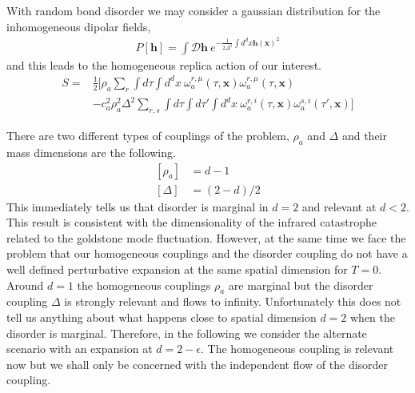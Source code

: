 \documentclass[notitlepage,onecolumn,showpacs,11pt]{revtex4-1}
\newcommand{\mbf}[1]{\mathbf{#1}}
\begin{document}
With random bond disorder we may consider a gaussian distribution for the inhomogeneous dipolar 
fields,
\begin{equation}
    \begin{aligned}
        P\left[\mbf{h}\right]=\int\mathcal{D}\mbf{h} \ 
        e^{-\frac{1}{2\Delta^2}\int d^dx\mbf{h}(\mbf{x})^2}
    \end{aligned}
\end{equation}
and this leads to the homogeneous replica action of our interest.
\begin{equation}
    \begin{aligned}
        S =& \frac{1}{2}\Big[
            \rho_a
            \sum_{r}\int d\tau\int d^dx\
            \omega^{r,\mu}_a(\tau,\mbf{x})\omega^{r,\mu}_a(\tau,\mbf{x})\\
            &-
            c^2_a\rho^2_a\Delta^2
            \sum_{r,s}
            \int d\tau\int d\tau'\int d^dx\
            \omega^{r,i}_a(\tau,\mbf{x})
            \omega^{s,i}_a(\tau',\mbf{x})
            \Big]
    \end{aligned}
\end{equation}

There are two different types of couplings of the problem, $\rho_a$ and $\Delta$ and their mass 
dimensions are the following.
\begin{equation}
    \begin{aligned}
        \left[\rho_a\right] &= d - 1\\
        \left[\Delta\right] &= (2-d)/2
    \end{aligned}
\end{equation}
This immediately tells us that disorder is marginal in $d=2$ and relevant at $d<2$. This
result is consistent with the dimensionality of the infrared catastrophe related to the
goldstone mode fluctuation. However, at the same time we face the problem that our
homogeneous couplings and the disorder coupling do not have a well defined perturbative 
expansion at the same spatial dimension for $T=0$. Around $d=1$ the homogeneous couplings
$\rho_a$ are marginal but the disorder coupling $\Delta$ is strongly relevant and flows to
infinity. Unfortunately this does not tell us anything about what happens close to spatial 
dimension $d=2$ when the disorder is marginal. Therefore, in the following we consider the 
alternate scenario with an expansion at $d=2-\epsilon$. The homogeneous coupling is relevant 
now but we shall only be concerned with the independent flow of the disorder coupling.
\end{document}
